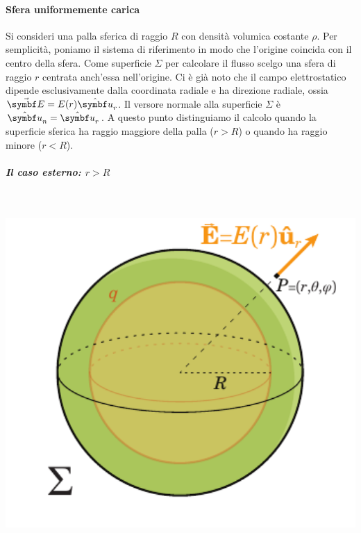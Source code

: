 \paragraph{Sfera uniformemente carica}
Si consideri una palla sferica di raggio $R$ con densità volumica costante $\rho$. Per semplicità, poniamo il sistema di riferimento in modo che l'origine coincida con il centro della sfera. Come superficie $\Sigma$ per calcolare il flusso scelgo una sfera di raggio $r$ centrata anch'essa nell'origine.
Ci è già noto che il campo elettrostatico dipende esclusivamente dalla coordinata radiale e ha direzione radiale, ossia $\vba{E}=E(r)\vbh{u}_r$. Il versore normale alla superficie $\Sigma$ è $\vbh{u}_n=\vbh{u}_r$.
A questo punto distinguiamo il calcolo quando la superficie sferica ha raggio maggiore della palla ($r>R$) o quando ha raggio minore ($r<R$).
\subparagraph{Il caso esterno: $r>R$}~\\
\begin{minipage}{0.45\textwidth}
	\begin{center}
		\includegraphics[width=1\textwidth]{images/chp2/chp2sferacarica1.pdf}
	\end{center}
\end{minipage}\hspace{5pt}
